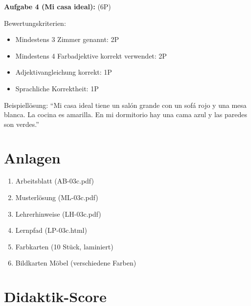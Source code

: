 \documentclass[11pt,a4paper]{article}
\begin{document}
\textbf{Aufgabe 4 (Mi casa ideal):} (6P)

Bewertungskriterien:
\begin{itemize}
    \item Mindestens 3 Zimmer genannt: 2P
    \item Mindestens 4 Farbadjektive korrekt verwendet: 2P
    \item Adjektivangleichung korrekt: 1P
    \item Sprachliche Korrektheit: 1P
\end{itemize}

Beispiellösung: ``Mi casa ideal tiene un salón grande con un sofá rojo y una mesa blanca. La cocina es amarilla. En mi dormitorio hay una cama azul y las paredes son verdes.''

\section{Anlagen}

\begin{enumerate}
    \item Arbeitsblatt (AB-03c.pdf)
    \item Musterlösung (ML-03c.pdf)
    \item Lehrerhinweise (LH-03c.pdf)
    \item Lernpfad (LP-03c.html)
    \item Farbkarten (10 Stück, laminiert)
    \item Bildkarten Möbel (verschiedene Farben)
\end{enumerate}

\newpage
\section{Didaktik-Score}
\end{document}
